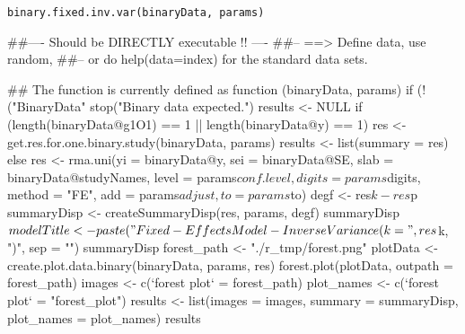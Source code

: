 \begin{Usage}
\begin{verbatim}
binary.fixed.inv.var(binaryData, params)
\end{verbatim}
\end{Usage}
\begin{Arguments}
\begin{ldescription}
\item[\code{binaryData}] 
\item[\code{params}] 
\end{ldescription}
\end{Arguments}
\begin{Examples}
\begin{ExampleCode}
##---- Should be DIRECTLY executable !! ----
##-- ==>  Define data, use random,
##--    or do  help(data=index)  for the standard data sets.

## The function is currently defined as
function (binaryData, params) 
{
    if (!("BinaryData" %
        stop("Binary data expected.")
    results <- NULL
    if (length(binaryData@g1O1) == 1 || length(binaryData@y) == 
        1) {
        res <- get.res.for.one.binary.study(binaryData, params)
        results <- list(summary = res)
    }
    else {
        res <- rma.uni(yi = binaryData@y, sei = binaryData@SE, 
            slab = binaryData@studyNames, level = params$conf.level, 
            digits = params$digits, method = "FE", add = params$adjust, 
            to = params$to)
        degf <- res$k - res$p
        summaryDisp <- createSummaryDisp(res, params, degf)
        summaryDisp$modelTitle <- paste("Fixed-Effects Model - Inverse Variance (k = ", 
            res$k, ")", sep = "")
        summaryDisp
        forest_path <- "./r_tmp/forest.png"
        plotData <- create.plot.data.binary(binaryData, params, 
            res)
        forest.plot(plotData, outpath = forest_path)
        images <- c(`forest plot` = forest_path)
        plot_names <- c(`forest plot` = "forest_plot")
        results <- list(images = images, summary = summaryDisp, 
            plot_names = plot_names)
    }
    results
  }
\end{ExampleCode}
\end{Examples}

